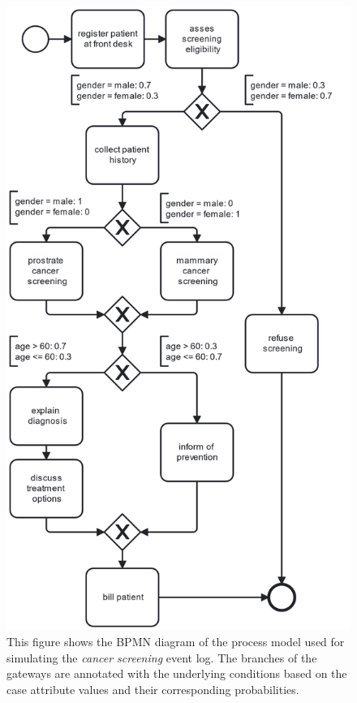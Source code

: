\begin{figure}[h!]
    \centering
    \includegraphics[width=\textwidth,height=0.7\textheight,keepaspectratio]{gfx/cancer_screening.png}
    \caption{This figure shows the BPMN diagram of the process model used for simulating the \textit{cancer screening} event log.
            The branches of the gateways are annotated with the underlying conditions based on the case attribute values and their corresponding probabilities.}
    \label{fig:cancer_screening}
\end{figure}

